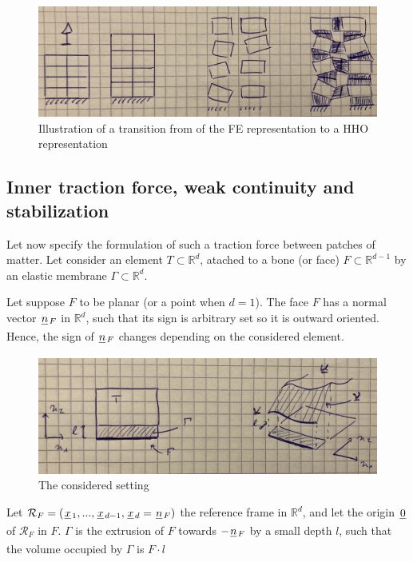 \documentclass[fleqn]{article}
\begin{document}
            \begin{figure}[h]
                \centering
                \includegraphics[width=10.cm]{img/deconstruction.png}
                \caption{Illustration of a transition from of the FE representation to a HHO representation}
                \label{fig_setting}
            \end{figure}

        \subsection{Inner traction force, weak continuity and stabilization}
        \label{sec_stabilization}

            Let now specify the formulation of such a traction force between patches of matter. Let consider an element $T \subset \mathbb{R}^d$, atached to a bone (or face) $F \subset \mathbb{R}^{d-1}$ by an elastic membrane $\Gamma \subset \mathbb{R}^d$.

            Let suppose $F$ to be planar (or a point when $d = 1$). The face $F$ has a normal vector $\lighttensori{n}\subscript{F}$ in $\mathbb{R}^d$, such that its sign is arbitrary set so it is outward oriented. Hence, the sign of $\lighttensori{n}\subscript{F}$ changes depending on the considered element.

            \begin{figure}[h]
                \centering
                \includegraphics[width=10.cm]{img/setting.png}
                \caption{The considered setting}
                \label{fig_setting}
            \end{figure}

            Let $\mathcal{R}_F = (\lighttensori{x}\subscript{1}, ..., \lighttensori{x}\subscript{d-1}, \lighttensori{x}\subscript{d} = \lighttensori{n}\subscript{F})$ the reference frame in $\mathbb{R}^d$, and let the origin $\lighttensori{0}$ of $\mathcal{R}_F$ in $F$.
            $\Gamma$ is the extrusion of $F$ towards $-\lighttensori{n}\subscript{F}$ by a small depth $l$, such that the volume occupied by $\Gamma$ is $F \cdot l$
\end{document}
